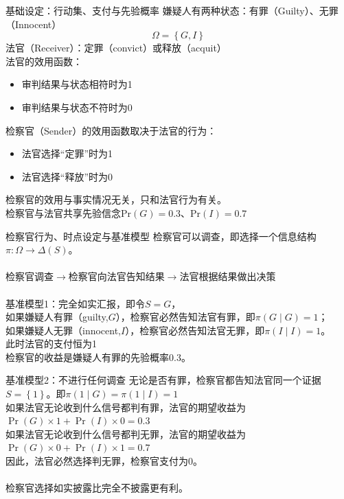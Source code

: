 \documentclass{beamer}
\begin{document}
\begin{frame}{基础设定：行动集、支付与先验概率}
	嫌疑人有两种状态：有罪（Guilty）、无罪（Innocent）\\
	$$\Omega=\left\lbrace G,I\right\rbrace $$
	法官（Receiver）：定罪（convict）或释放（acquit）\\
	法官的效用函数：
	\begin{itemize}
		\item[] 审判结果与状态相符时为1
		\item[] 审判结果与状态不符时为0
	\end{itemize}
	检察官（Sender）的效用函数取决于法官的行为：
	\begin{itemize}
		\item[] 法官选择“定罪”时为1
		\item[] 法官选择“释放”时为0
	\end{itemize}
	检察官的效用与事实情况无关，只和法官行为有关。\\
	检察官与法官共享先验信念Pr$\left(G\right)=0.3$、Pr$\left(I\right)=0.7$

\end{frame}

\begin{frame}{检察官行为、时点设定与基准模型}
	检察官可以调查，即选择一个信息结构$\pi: \Omega\to\Delta\left(S\right)$。\\~\\
	检察官调查$\to$检察官向法官告知结果$\to$法官根据结果做出决策\\~\\
	基准模型1：完全如实汇报，即令$S=G$，\\
	如果嫌疑人有罪（guilty,$ G $），检察官必然告知法官有罪，即$\pi\left(G\mid G\right)=1$；\\
	如果嫌疑人无罪（innocent,$ I $），检察官必然告知法官无罪，即$\pi\left(I\mid I\right)=1$。\\
	此时法官的支付恒为1\\
	检察官的收益是嫌疑人有罪的先验概率0.3。
\end{frame}

\begin{frame}{基准模型2：不进行任何调查}
	无论是否有罪，检察官都告知法官同一个证据$S=\left\lbrace 1\right\rbrace $。即$\pi\left(1\mid G\right)=\pi\left(1\mid I\right)=1$\\
	如果法官无论收到什么信号都判有罪，法官的期望收益为\\
	$\Pr(G)\times1+\Pr(I)\times0=0.3$\\
	如果法官无论收到什么信号都判无罪，法官的期望收益为\\
	$\Pr(G)\times0+\Pr(I)\times1=0.7$\\\pause
	因此，法官必然选择判无罪，检察官支付为0。\pause\\~\\
	检察官选择如实披露比完全不披露更有利。
\end{frame}
\end{document}
